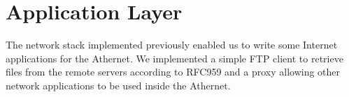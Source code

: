 \section{Application Layer}
The network stack implemented previously enabled us to write some Internet applications for the Athernet. We implemented a simple FTP client to retrieve files from the remote servers according to RFC959 and a proxy allowing other network applications to be used inside the Athernet.

